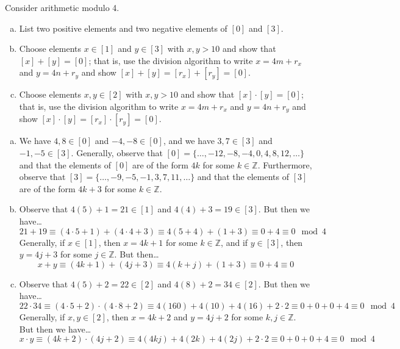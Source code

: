 \documentclass[11pt,letterpaper]{article}
\begin{document}
 Consider arithmetic modulo 4. 
	\begin{enumerate}[(a)]
	\item List two positive elements and two negative elements of $[0]$ and $[3]$. 
	\item Choose elements $x \in [1]$ and $y \in [3]$ with $x, y > 10$ and show that $[x] + [y]= [0]$; that is, use the division algorithm to write $x= 4m + r_x$ and $y= 4n + r_y$ and show $[x] + [y]= [r_x] + [r_y]= [0]$.  
	\item Choose elements $x, y \in [2]$ with $x, y > 10$ and show that $[x] \cdot [y]= [0]$; that is, use the division algorithm to write $x= 4m + r_x$ and $y= 4n + r_y$ and show $[x] \cdot [y]= [r_x] \cdot [r_y]= [0]$. 
	\end{enumerate} \pspace

\sol 
\begin{enumerate}[(a)]
\item We have $4, 8 \in [0]$ and $-4, -8 \in [0]$, and we have $3, 7 \in [3]$ and $-1, -5 \in [3]$. Generally, observe that $[0]= \{ \ldots, -12, -8, -4, 0, 4, 8, 12, \ldots \}$ and that the elements of $[0]$ are of the form $4k$ for some $k \in \mathbb{Z}$. Furthermore, observe that $[3]= \{ \ldots, -9, -5, -1, 3, 7, 11, \ldots \}$ and that the elements of $[3]$ are of the form $4k + 3$ for some $k \in \mathbb{Z}$. \pspace

\item Observe that $4(5) + 1= 21 \in [1]$ and $4(4) + 3= 19 \in [3]$. But then we have\dots
	\[
	21 + 19 \equiv (4 \cdot 5 + 1) + (4 \cdot 4 + 3) \equiv 4(5 + 4) + (1 + 3) \equiv 0 + 4 \equiv 0 \mod 4
	\]
Generally, if $x \in [1]$, then $x= 4k + 1$ for some $k \in \mathbb{Z}$, and if $y \in [3]$, then $y= 4j + 3$ for some $j \in \mathbb{Z}$. But then\dots
	\[
	x + y \equiv (4k + 1) + (4j + 3) \equiv 4(k + j) + (1 + 3) \equiv 0 + 4 \equiv 0
	\]

\item Observe that $4(5) + 2= 22 \in [2]$ and $4(8) + 2= 34 \in [2]$. But then we have\dots
	\[
	22 \cdot 34 \equiv (4 \cdot 5 + 2) \cdot (4 \cdot 8 + 2) \equiv 4(160) + 4 (10) + 4(16) + 2 \cdot 2 \equiv 0 + 0 + 0 + 4 \equiv 0 \mod 4
	\]
Generally, if $x, y \in [2]$, then $x= 4k + 2$ and $y= 4j + 2$ for some $k, j \in \mathbb{Z}$. But then we have\dots
	\[
	x \cdot y \equiv (4k + 2) \cdot (4j + 2) \equiv 4(4kj) + 4(2k) + 4(2j) + 2 \cdot 2 \equiv 0 + 0 + 0 + 4 \equiv 0 \mod 4
	\]
\end{enumerate}
\end{document}
